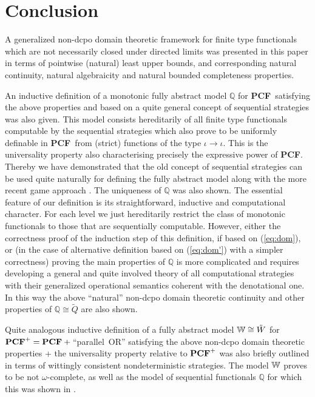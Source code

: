 \documentclass[fleqn]{LMCS}
\theoremstyle{plain}\newtheorem{satz}[thm]{Satz}
\theoremstyle{plain}\newtheorem{hyp}[thm]{Hypothesis}
\theoremstyle{plain}\newtheorem{hyps}[thm]{Hypotheses}
\theoremstyle{definition}\newtheorem{note}[thm]{Note}
\newcommand{\arr}{\rightarrow}
\newcommand{\bbQ}{\mathbb{Q}}
\newcommand{\PCF}{\mbox{\bf PCF}}
\newcommand{\tQ}{\tilde{Q}}
\newcommand{\tW}{\tilde{W}}
\newcommand{\?}{\mbox{?}}
\begin{document}
\section{Conclusion}
\label{sec:conclusion}

\noindent
A generalized non-dcpo domain theoretic framework for finite type functionals 
which are not necessarily closed under directed limits was presented in this paper 
in terms of pointwise (natural) least upper bounds, and corresponding 
natural continuity, natural algebraicity and natural bounded completeness 
properties. 

An inductive definition of a monotonic fully abstract 
model $\bbQ$ for \PCF\ satisfying the above properties and 
based on a quite general concept of 
sequential strategies was also given. 
This model consists hereditarily of all finite type functionals 
computable by the sequential 
strategies which also prove to be uniformly definable in \PCF\ from 
(strict)
functions of the type $\iota\arr\iota$. 
This is the universality property also characterising 
precisely the expressive power of \PCF. 
Thereby we have demonstrated 
that the old concept of sequential strategies \cite{Saz76SMZH,Saz76AL} 
can be used quite naturally for defining the fully abstract 
model along with 
the more recent game approach 
\cite{Abramsky-Jagadeesan2000,Hyland-Ong2000,Nickau96}. 
The uniqueness of $\bbQ$ was also shown. 
The essential feature of our definition is its straightforward, 
inductive and computational character. 
For each level we just hereditarily restrict the class of monotonic 
functionals to those that are sequentially computable. 
However, either the correctness proof of the induction step of 
this definition, if based on (\ref{eq:dom}), 
or (in the case of alternative definition based on (\ref{eq:dom'}) with a simpler 
correctness) proving the main properties 
of $\bbQ$ is more complicated 
and requires developing a general and quite involved theory of all 
computational strategies 
with their generalized operational semantics 
coherent with the denotational one. 
In this way the above ``natural'' 
non-dcpo domain theoretic continuity and other properties of 
$\bbQ\cong\tQ$ are also shown. 

Quite analogous inductive definition of a fully abstract model 
$\bbW\cong\tW$ for $\PCF^+ = \PCF+{}$``\mbox{parallel OR}'' satisfying 
the above non-dcpo domain theoretic properties 
+ the universality property relative to $\PCF^+$ 
was also briefly outlined in terms 
of wittingly consistent nondeterministic strategies.  
The model $\mathbb{W}$ proves to be not $\omega$-complete, as well as  
the model of sequential functionals $\bbQ$ 
for which this was shown in \cite{Normann2004}.  
\end{document}
